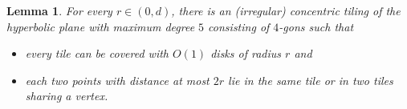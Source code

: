 \documentclass[11pt]{article}
\newtheorem{lemma}[theorem]{Lemma}
\providecommand{\todo}[2][]{}
\newcommand{\Thomas}[1]{}
\begin{document}
%
%
\begin{lemma}\label{lem:tiling_small_radius}
    For every $ r \in (0, d) $, there is an (irregular) concentric tiling of the hyperbolic plane with maximum degree $ 5 $ consisting of $ 4 $-gons such that
    \begin{itemize}
        \item every tile can be covered with $ O(1) $ disks of radius $ r $ and
        \item each two points with distance at most $ 2r $ lie in the same tile or in two tiles sharing a vertex.
    \end{itemize}
%
\end{lemma}
%
\end{document}
